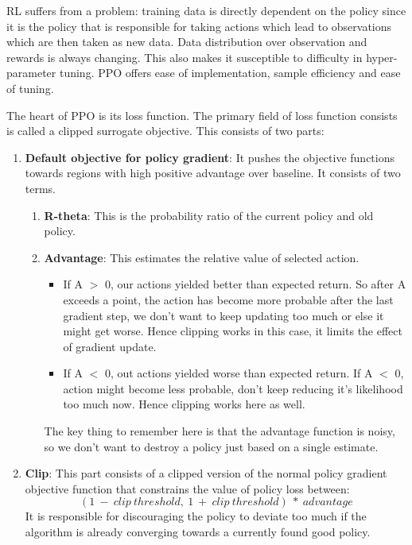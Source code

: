 \documentclass[conference]{IEEEtran}
\begin{document}
RL suffers from a problem: training data is directly dependent on the policy since it is the policy that is responsible for taking actions which lead to observations which are then taken as new data. Data distribution over observation and rewards is always changing. This also makes it susceptible to difficulty in hyper-parameter tuning. PPO offers ease of implementation, sample efficiency and ease of tuning.

The heart of PPO is its loss function. The primary field of loss function consists is called a clipped surrogate objective. This consists of two parts:

\begin{enumerate}
  \item \textbf{Default objective for policy gradient}:
    It pushes the objective functions towards regions with high positive advantage over baseline. It consists of two terms.
    \begin{enumerate}
        \item \textbf{R-theta}:
            This is the probability ratio of the current policy and old policy. 
        \item \textbf{Advantage}:
            This estimates the relative value of selected action. 
            \begin{itemize}
                \item If A $>$ 0, our actions yielded better than expected return. So after A exceeds a point, the action has become more probable after the last gradient step, we don’t want to keep updating too much or else it might get worse. Hence clipping works in this case, it limits the effect of gradient update.
                \item If A $<$ 0, out actions yielded worse than expected return. If A $<$ 0, action might become less probable, don’t keep reducing it’s likelihood too much now. Hence clipping works here as well.
            \end{itemize}
            The key thing to remember here is that the advantage function is noisy, so we don’t want to destroy a policy just based on a single estimate.
    \end{enumerate}
  \item \textbf{Clip}: This part consists of a clipped version of the normal policy gradient objective function that constrains the value of policy loss between:
  \[(1\ -\ clip\ threshold,\ 1\ +\ clip\ threshold)\ *\ advantage\]
  It is responsible for discouraging the policy to deviate too much if the algorithm is already converging towards a currently found good policy.
\end{enumerate}
\end{document}

